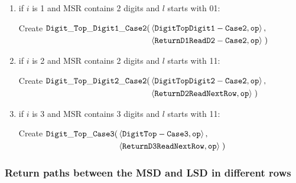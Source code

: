 \begin{itemize}
\begin{enumerate}[label=\alph*)]
                \item if $i$ is 1 and MSR contains 2 digits and $l$ starts with 01:

                Create
                $\begin{aligned}[t]
                    {\tt Digit\_Top\_Digit1\_Case2}(& \left \langle {\tt DigitTopDigit1-Case2}, {\tt op} \right\rangle, & \\
                                     & \left \langle {\tt ReturnD1ReadD2-Case2}, {\tt op} \right\rangle \;)
                \end{aligned}$
                \vspace{.5cm}


                \item if $i$ is 2 and MSR contains 2 digits and $l$ starts with 11:

                Create
                $\begin{aligned}[t]
                    {\tt Digit\_Top\_Digit2\_Case2}(& \left \langle {\tt DigitTopDigit2-Case2}, {\tt op} \right\rangle, & \\
                                     & \left \langle {\tt ReturnD2ReadNextRow},  {\tt op} \right\rangle \;)
                \end{aligned}$
                \vspace{.5cm}


                \item if $i$ is 3 and MSR contains 3 digits and $l$ starts with 11:

                Create
                $\begin{aligned}[t]
                    {\tt Digit\_Top\_Case3}(& \left \langle {\tt DigitTop-Case3},      {\tt op} \right\rangle, & \\
                                   & \left \langle {\tt ReturnD3ReadNextRow}, {\tt op} \right\rangle \;)
                \end{aligned}$
                \vspace{.5cm}


            \end{enumerate}

        \end{itemize}
    \vspace{1cm}



    \subsubsection{Return paths between the MSD and LSD in different rows}

